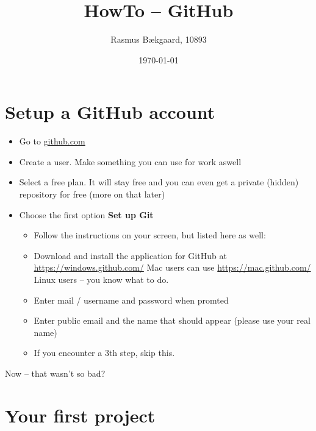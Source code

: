 \documentclass{article}
\title{HowTo -- GitHub}
\author{Rasmus Bækgaard, 10893}
\date{\today}
\begin{document}
\maketitle

\section{Setup a GitHub account}

\begin{itemize}
\item Go to \url{github.com}

\item Create a user.
\subitem Make something you can use for work aswell

\item Select a free plan. 
It will stay free and you can even get a private (hidden) repository for free (more on that later)

\item Choose the first option \textbf{Set up Git}

	\begin{itemize}
	\item[] Follow the instructions on your screen, but listed here as well:

	\item Download and install the application for GitHub at \url{https://windows.github.com/} 
	\subitem Mac users can use \url{https://mac.github.com/}
	\subitem Linux users -- you know what to do.

	\item Enter mail / username and password when promted

	\item Enter public email and the name that should appear (please use your real name)

	\item If you encounter a 3th step, skip this.
	\end{itemize}

\end{itemize}

Now -- that wasn't so bad?


\section{Your first project}
\end{document}
